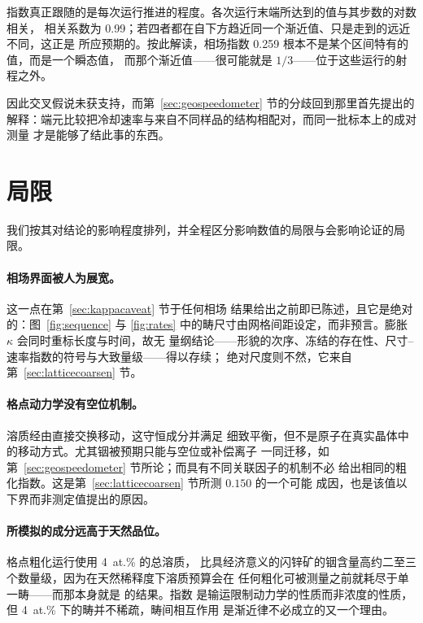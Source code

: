 \documentclass[11pt,a4paper]{ctexart}
\begin{document}
指数真正跟随的是每次运行推进的程度。各次运行末端所达到的值与其步数的对数相关，
相关系数为 0.99；若四者都在自下方趋近同一个渐近值、只是走到的远近不同，这正是
所应预期的。按此解读，相场指数 0.259 根本不是某个区间特有的值，而是一个瞬态值，
而那个渐近值——很可能就是 $1/3$——位于这些运行的射程之外。

因此交叉假说未获支持，而第~\ref{sec:geospeedometer} 节的分歧回到那里首先提出的
解释：端元比较把冷却速率与来自不同样品的结构相配对，而同一批标本上的成对测量
才是能够了结此事的东西。

\section{局限}
\label{sec:limitations}

我们按其对结论的影响程度排列，并全程区分影响数值的局限与会影响论证的局限。

\paragraph{相场界面被人为展宽。} 这一点在第~\ref{sec:kappacaveat} 节于任何相场
结果给出之前即已陈述，且它是绝对的：图~\ref{fig:sequence} 与 \ref{fig:rates}
中的畴尺寸由网格间距设定，而非预言。膨胀 $\kappa$ 会同时重标长度与时间，故无
量纲结论——形貌的次序、冻结的存在性、尺寸--速率指数的符号与大致量级——得以存续；
绝对尺度则不然，它来自第~\ref{sec:latticecoarsen} 节。

\paragraph{格点动力学没有空位机制。} 溶质经由直接交换移动，这守恒成分并满足
细致平衡，但不是原子在真实晶体中的移动方式。尤其铟被预期只能与空位或补偿离子
一同迁移，如第~\ref{sec:geospeedometer} 节所论；而具有不同关联因子的机制不必
给出相同的粗化指数。这是第~\ref{sec:latticecoarsen} 节所测 $0.150$ 的一个可能
成因，也是该值以下界而非测定值提出的原因。

\paragraph{所模拟的成分远高于天然品位。} 格点粗化运行使用 4~at.\% 的总溶质，
比具经济意义的闪锌矿的铟含量高约二至三个数量级，因为在天然稀释度下溶质预算会在
任何粗化可被测量之前就耗尽于单一畴——而那本身就是 \citet{yu2026b} 的结果。指数
是输运限制动力学的性质而非浓度的性质，但 4~at.\% 下的畴并不稀疏，畴间相互作用
是渐近律不必成立的又一个理由。
\end{document}
